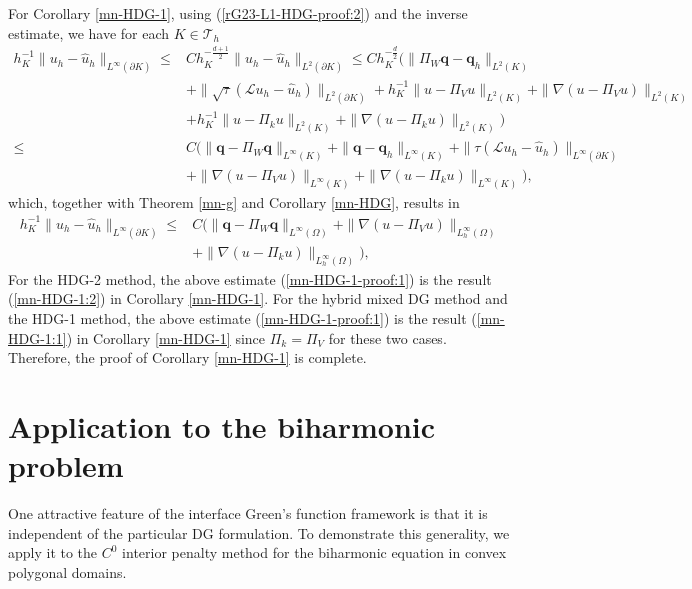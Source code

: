 \documentclass[1996/10/24]{amsart}
\theoremstyle{definition}
\numberwithin{equation}{section}
\begin{document}
For Corollary \ref{mn-HDG-1}, using (\ref{rG23-L1-HDG-proof:2}) and the inverse estimate, we have for each $K\in\mathcal{T}_h$
\begin{align}
h_K^{-1}\|u_h-\widehat{u}_h\|_{L^{\infty}(\partial K)}\leq& Ch_K^{-\frac{d+1}{2}}\|u_h-\widehat{u}_h\|_{L^2(\partial K)}\leq Ch_K^{-\frac{d}{2}}\Big(
\|\Pi_W{\bm q}-{\bm q}_h\|_{L^2(K)}\nonumber\\
&+\|\sqrt{\tau}(\mathcal{L}u_h-\widehat{u}_h)\|_{L^2(\partial K)}+h_K^{-1}\|u-\Pi_Vu\|_{L^2(K)}+\|\nabla(u-\Pi_Vu)\|_{L^2(K)}\nonumber\\
&+h_K^{-1}\|u-\Pi_ku\|_{L^2(K)}+\|\nabla(u-\Pi_ku)\|_{L^2(K)}\Big)\nonumber\\
\leq&C\Big(\|{\bm q}-\Pi_W{\bm q}\|_{L^{\infty}(K)}+\|{\bm q}-{\bm q}_h\|_{L^{\infty}(K)}+\|\tau(\mathcal{L}u_h-\widehat{u}_h)\|_{L^{\infty}(\partial K)}\nonumber\\
&+\|\nabla(u-\Pi_Vu)\|_{L^{\infty}(K)}+\|\nabla(u-\Pi_ku)\|_{L^{\infty}(K)}\Big),\nonumber
\end{align}
which, together with Theorem \ref{mn-g} and Corollary \ref{mn-HDG}, results in
\begin{align}
h_K^{-1}\|u_h-\widehat{u}_h\|_{L^{\infty}(\partial K)}\leq&C\Big(\|{\bm q}-\Pi_W{\bm q}\|_{L^{\infty}(\Omega)}+
\|\nabla(u-\Pi_Vu)\|_{L_h^{\infty}(\Omega)}\nonumber\\
&+\|\nabla(u-\Pi_ku)\|_{L_h^{\infty}(\Omega)}\Big),\label{mn-HDG-1-proof:1}
\end{align}
For the HDG-2 method, the above estimate (\ref{mn-HDG-1-proof:1}) is the result (\ref{mn-HDG-1:2}) in Corollary \ref{mn-HDG-1}. For the hybrid mixed DG method and the HDG-1 method, the above estimate (\ref{mn-HDG-1-proof:1}) is the result (\ref{mn-HDG-1:1}) in Corollary \ref{mn-HDG-1} since $\Pi_k=\Pi_V$ for these two cases. Therefore, the proof of Corollary \ref{mn-HDG-1} is complete.

\section{Application to the biharmonic problem}\label{sec5}
One attractive feature of the interface Green's function framework is that it is independent of the particular
DG formulation. To demonstrate this generality, we apply it to the \(C^0\) interior penalty method for the
biharmonic equation in convex polygonal domains.
\end{document}
